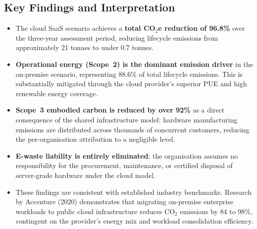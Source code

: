 \vspace{0.5em}

\subsection{Key Findings and Interpretation}

\begin{itemize}[label=\textcolor{midgreen}{$\bullet$}]

  \item The cloud SaaS scenario achieves a \textbf{total CO$_2$e reduction
    of 96.8\%} over the three-year assessment period, reducing lifecycle
    emissions from approximately 21 tonnes to under 0.7 tonnes.

  \item \textbf{Operational energy (Scope~2) is the dominant emission
    driver} in the on-premise scenario, representing 88.6\% of total
    lifecycle emissions. This is substantially mitigated through the cloud
    provider's superior PUE and high renewable energy coverage.

  \item \textbf{Scope~3 embodied carbon is reduced by over 92\%} as a
    direct consequence of the shared infrastructure model: hardware
    manufacturing emissions are distributed across thousands of concurrent
    customers, reducing the per-organisation attribution to a negligible
    level.

  \item \textbf{E-waste liability is entirely eliminated}: the organisation
    assumes no responsibility for the procurement, maintenance, or
    certified disposal of server-grade hardware under the cloud model.

  \item These findings are consistent with established industry benchmarks.
    Research by Accenture (2020) demonstrates that migrating on-premise
    enterprise workloads to public cloud infrastructure reduces CO$_2$
    emissions by 84 to 98\%, contingent on the provider's energy mix and
    workload consolidation efficiency.

\end{itemize}

\newpage